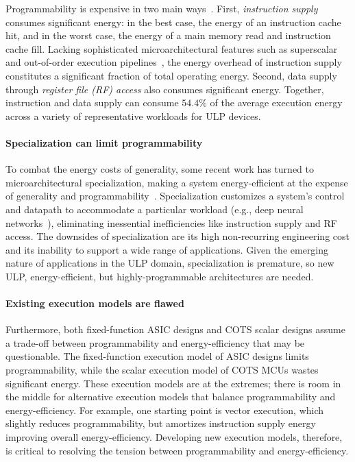 Programmability is expensive in two main ways~\cite{horowitz:isscc14:energy-keynote,hameed2010understanding,balfour_elm_thesis}.
First, \emph{instruction supply} consumes significant energy: in the best case, the energy of
an instruction cache hit, and in the worst case, the energy of a main memory
read and instruction cache fill.  
%
Lacking sophisticated microarchitectural features such as superscalar and
out-of-order execution pipelines~\cite{msp430fr5994,traber2016pulpino}, the energy overhead of
instruction supply constitutes a significant fraction of total operating energy.
%
Second, data supply through \emph{register file (RF) access} also consumes significant energy.
%
Together, instruction and data supply can consume
$54.4\%$ of the average execution energy across a variety of representative workloads for ULP devices.

\paragraph{Specialization can limit programmability}
To combat the energy costs of generality, some recent work has turned to
microarchitectural specialization, making a system energy-efficient at the
expense of generality and
programmability~\cite{chen:isca16:eyeriss,chen:asplos14:diannao,du:isca15:shidiannao,liu:isca15:pudiannao,chen2014dadiannao,venkatesh2010conservation}.
% 
Specialization customizes a system's control and datapath to accommodate a
particular workload (e.g., deep neural networks~\cite{chen:isca16:eyeriss,chen:asplos14:diannao}),
eliminating inessential inefficiencies like instruction supply and RF access.
% 
The downsides of specialization are its high non-recurring engineering cost and its inability to support a wide range of applications.
% 
Given the emerging nature of applications in the ULP domain, specialization is premature, so new ULP, energy-efficient, but highly-programmable architectures are needed.

\paragraph{Existing execution models are flawed}
Furthermore, both fixed-function ASIC designs and COTS scalar designs assume a trade-off between programmability and energy-efficiency that may be questionable.
% 
The fixed-function execution model of ASIC designs limits programmability, while the scalar execution model of COTS MCUs wastes significant energy.
% 
These execution models are at the extremes; there is room in the middle for alternative execution models that balance programmability and energy-efficiency.
% 
For example, one starting point is vector execution, which slightly reduces programmability, but amortizes instruction supply energy improving overall energy-efficiency.
% 
Developing new execution models, therefore, is critical to resolving the tension between programmability and energy-efficiency.

